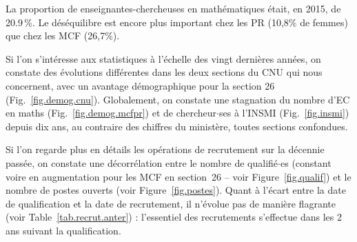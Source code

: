 La proportion de enseignantes-chercheuses en math\'ematiques \'etait, en 2015, de 20.9\,\%. %
Le d\'es\'equilibre est encore plus important chez les PR (10,8\% de %
femmes) que chez les MCF (26,7\%). %

Si l'on s'int\'eresse aux statistiques \`a l'\'echelle des vingt derni\`eres ann\'ees, on constate des \'evolutions
diff\'erentes dans les deux sections du CNU qui nous concernent, avec un avantage d\'emographique pour la section 26 (Fig.~\ref{fig.demog.cnu}).
Globalement, on constate une stagnation du nombre d'EC en maths (Fig.~\ref{fig.demog.mcfpr}) et de chercheur$\cdot$ses \`a l'INSMI 
(Fig.~\ref{fig.insmi}) depuis dix ans, au contraire des chiffres du minist\`ere, toutes sections
confondues.

Si l'on regarde plus en d\'etails les op\'erations de recrutement sur la d\'ecennie pass\'ee, on
constate une d\'ecorr\'elation entre le nombre de qualifi\'e$\cdot$es (constant voire en augmentation pour les MCF en section~26 
-- voir Figure~\ref{fig.qualif})
et le nombre de postes ouverts (voir Figure~\ref{fig.postes}). 
Quant \`a l'\'ecart entre la date de qualification et la date de recrutement, il n'\'evolue pas de mani\`ere flagrante
(voir Table~\ref{tab.recrut.anter}) : l'essentiel des recrutements s'effectue dans les 2 ans suivant la qualification.

